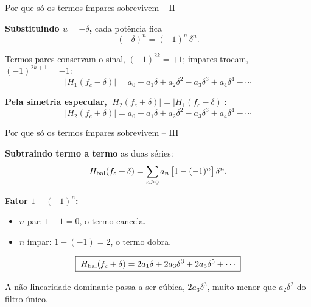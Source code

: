
\begin{frame}{Por que só os termos ímpares sobrevivem -- II}

\textbf{Substituindo $u = -\delta$,} cada potência fica
\[
(-\delta)^n = (-1)^n\,\delta^n.
\]

\pause
\vspace{0.2cm}
Termos pares conservam o sinal, $(-1)^{2k} = +1$; ímpares trocam, $(-1)^{2k+1} = -1$:
\[
|H_1(f_c - \delta)| = a_0 - a_1 \delta + a_2 \delta^2 - a_3 \delta^3 + a_4 \delta^4 - \cdots
\]

\pause
\vspace{0.2cm}
\textbf{Pela simetria especular,} $|H_2(f_c + \delta)| = |H_1(f_c - \delta)|$:
\[
|H_2(f_c + \delta)| = a_0 - a_1 \delta + a_2 \delta^2 - a_3 \delta^3 + a_4 \delta^4 - \cdots
\]

\end{frame}


\begin{frame}{Por que só os termos ímpares sobrevivem -- III}

\textbf{Subtraindo termo a termo} as duas séries:
\[
H_{\rm bal}(f_c + \delta) = \sum_{n \geq 0} a_n\,\bigl[1 - (-1)^n\bigr]\,\delta^n.
\]

\pause
\vspace{0.2cm}
\textbf{Fator $1 - (-1)^n$:}
\begin{itemize}\itemsep0pt
\item $n$ par: $1 - 1 = 0$, o termo cancela.
\item $n$ ímpar: $1 - (-1) = 2$, o termo dobra.
\end{itemize}

\pause
\vspace{0.3cm}
\[
\boxed{\;H_{\rm bal}(f_c + \delta) = 2 a_1 \delta + 2 a_3 \delta^3 + 2 a_5 \delta^5 + \cdots\;}
\]

A não-linearidade dominante passa a ser cúbica, $2 a_3 \delta^3$, muito menor que $a_2 \delta^2$ do filtro único.

\end{frame}


